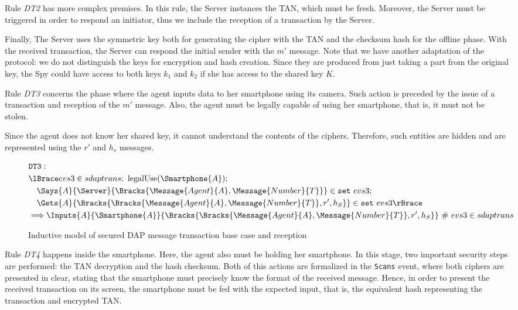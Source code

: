Rule \textit{DT2} has more complex premises. In this rule, the Server instances the TAN, which must be fresh. Moreover, the Server must be triggered in order to respond an initiator, thus we include the reception of a transaction by the Server. 

Finally, The Server uses the symmetric key both for generating the cipher with the TAN and the checksum hash for the offline phase. With the received transaction, the Server can respond the initial sender with the \(m'\) message. Note that we have another adaptation of the protocol: we do not distinguish the keys for encryption and hash creation. Since they are produced from just taking a part from the original key, the Spy could have access to both keys \(k_1\) and \(k_2\) if she has access to the shared key \(K\).

Rule \textit{DT3} concerns the phase where the agent inputs data to her smartphone using its camera. Such action is preceded by the issue of a transaction and reception of the \(m'\) message. Also, the agent must be legally capable of using her smartphone, that is, it must not be stolen.

Since the agent does not know her shared key, it cannot understand the contents of the ciphers. Therefore, such entities are hidden and are represented using the \(r'\) and \(h_s\) messages.

\begin{figure}[h!]
  \begin{align*}
    & \texttt{DT3}: \newline \\
    & \lBrace evs3 \in sdaptrans;\ \text{legalUse}(\Smartphone{A}); \\
    & \quad \Says{A}{\Server}{\Bracks{\Message{Agent}{A}, \Message{Number}{T}}} \in \texttt{set} \ evs3; \\
    & \quad \Gets{A}{\Bracks{\Bracks{\Message{Agent}{A}, \Message{Number}{T}}, r', h_S}} \in \texttt{set} \ evs3 \rBrace \\
    & \Longrightarrow \Inputs{A}{\Smartphone{A}}{\Bracks{\Bracks{\Message{Agent}{A}, \Message{Number}{T}}, r', h_S}}   \ \# \ evs3 \in sdaptrans
  \end{align*}
  \label{fig:dap-model-3}
  \caption{Inductive model of secured DAP message transaction base case and reception}
\end{figure}

Rule \textit{DT4} happens inside the smartphone. Here, the agent also must be holding her smartphone. In this stage, two important security steps are performed: the TAN decryption and the hash checksum. Both of this actions are formalized in the \texttt{Scans} event, where both ciphers are presented in clear, stating that the smartphone must precisely know the format of the received message. Hence, in order to present the received transaction on its screen, the smartphone must be fed with the expected input, that is, the equivalent hash representing the transaction and encrypted TAN.

